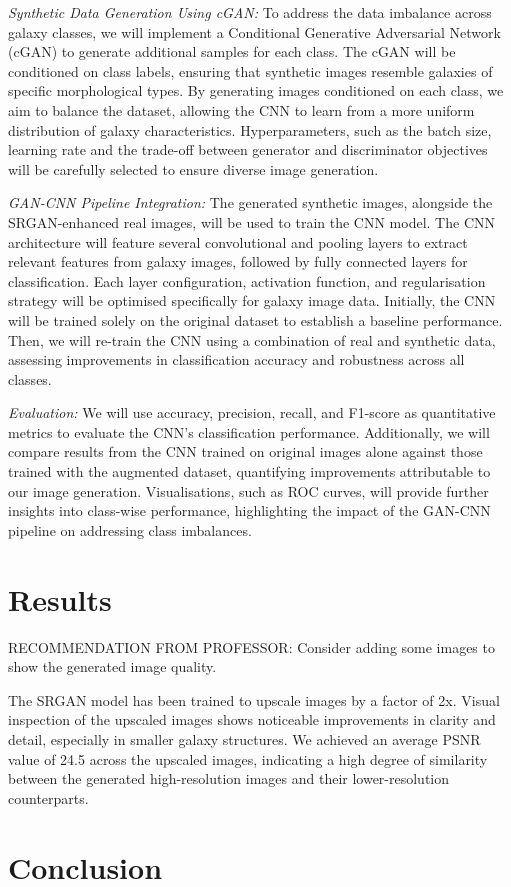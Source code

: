 \documentclass[10pt,twocolumn,letterpaper]{article}
\begin{document}
\textit{Synthetic Data Generation Using cGAN:} To address the data imbalance across galaxy classes, we will implement a Conditional Generative Adversarial Network (cGAN) to generate additional samples for each class. 
The cGAN will be conditioned on class labels, ensuring that synthetic images resemble galaxies of specific morphological types. 
By generating images conditioned on each class, we aim to balance the dataset, allowing the CNN to learn from a more uniform distribution of galaxy characteristics. 
Hyperparameters, such as the batch size, learning rate and the trade-off between generator and discriminator objectives will be carefully selected to ensure diverse image generation.

\textit{GAN-CNN Pipeline Integration:} The generated synthetic images, alongside the SRGAN-enhanced real images, will be used to train the CNN model. 
The CNN architecture will feature several convolutional and pooling layers to extract relevant features from galaxy images, followed by fully connected layers for classification. 
Each layer configuration, activation function, and regularisation strategy will be optimised specifically for galaxy image data. 
Initially, the CNN will be trained solely on the original dataset to establish a baseline performance. 
Then, we will re-train the CNN using a combination of real and synthetic data, assessing improvements in classification accuracy and robustness across all classes.

\textit{Evaluation:} We will use accuracy, precision, recall, and F1-score as quantitative metrics to evaluate the CNN's classification performance. 
Additionally, we will compare results from the CNN trained on original images alone against those trained with the augmented dataset, quantifying improvements attributable to our image generation. 
Visualisations, such as ROC curves, will provide further insights into class-wise performance, highlighting the impact of the GAN-CNN pipeline on addressing class imbalances.


\section{Results}
RECOMMENDATION FROM PROFESSOR:
Consider adding some images to show the generated image quality.

The SRGAN model has been trained to upscale images by a factor of 2x. 
Visual inspection of the upscaled images shows noticeable improvements in clarity and detail, especially in smaller galaxy structures. 
We achieved an average PSNR value of 24.5 across the upscaled images, indicating a high degree of similarity between the generated high-resolution images and their lower-resolution counterparts.

\section{Conclusion}

{
    \small
    \nocite{*}
    
    
}
\end{document}
